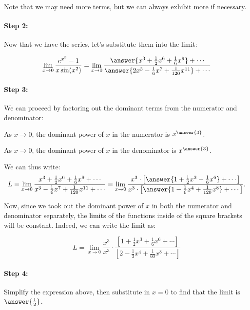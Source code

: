 \documentclass{ximera}
\begin{document}
\begin{exercise}
\begin{exercise}
Note that we may need more terms, but we can always exhibit more if necessary.  

\paragraph{Step 2:} Now that we have the series, let's substitute them into the limit:

\[
\lim_{x \to 0} \frac{e^{x^3}-1}{x \sin(x^2)} = \lim_{x \to 0} \frac{  \answer{x^3+\frac{1}{2}x^6+\frac{1}{6}x^9} +\cdots}{\answer{2x^3-\frac{1}{6}x^7+\frac{1}{120}x^{11}} +\cdots}
\]

\paragraph{Step 3:} We can proceed by factoring out the dominant terms from the numerator and denominator:

As $x \to 0$, the dominant power of $x$ in the numerator is $x^{\answer{3}}$.

As $x \to 0$, the dominant power of $x$ in the denominator is $x^{\answer{3}}$.

\begin{exercise}
We can thus write:
\[
L = \lim_{x \to 0} \frac{ x^3+\frac{1}{2}x^6+\frac{1}{6}x^9 +\cdots}{x^3-\frac{1}{6}x^7+\frac{1}{120}x^{11} +\cdots}  = \lim_{x \to 0} \frac{ x^3 \cdot \left[\answer{1+\frac{1}{2}x^3+\frac{1}{6}x^6} +\cdots\right]}{x^3 \cdot \left[\answer{1-\frac{1}{6}x^4+\frac{1}{120}x^{8}} +\cdots\right]}.
\]

\begin{exercise}
 Now, since we took out the dominant power of $x$ in both the numerator and denominator separately, the limits of the functions inside of the square brackets will be constant.  Indeed, we can write the limit as:

\[
L = \lim_{x \to 0} \frac{x^3}{x^3} \cdot \frac{\left[1+\frac{1}{2}x^3+\frac{1}{6}x^6+\cdots \right]}{\left[2-\frac{1}{3}x^4+\frac{1}{60}x^8 +\cdots \right]}
\]

\paragraph{Step 4:} Simplify the expression above, then substitute in $x=0$ to find that the limit is $\answer{\frac{1}{2}}$.


\end{exercise}
\end{exercise}
\end{exercise}
\end{exercise}
\end{document}

